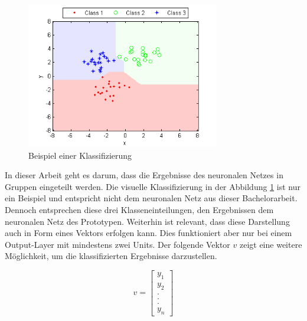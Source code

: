 \begin{figure}[H]
	\centering
		\includegraphics[width=0.75\textwidth]{images/nn_classifier.png}
	\caption{Beispiel einer Klassifizierung \citep{yuClass}}
	\label{fig:nn_class}
\end{figure}

In dieser Arbeit geht es darum, dass die Ergebnisse des neuronalen Netzes in Gruppen eingeteilt werden. Die visuelle Klassifizierung in der Abbildung \ref{fig:nn_class} ist nur ein Beispiel und entspricht nicht dem neuronalen Netz aus dieser Bachelorarbeit. Dennoch entsprechen diese drei Klasseneinteilungen, den Ergebnissen dem neuronalen Netz des Prototypen. Weiterhin ist relevant, dass diese Darstellung auch in Form eines Vektors erfolgen kann. Dies funktioniert aber nur bei einem Output-Layer mit mindestens zwei Units. Der folgende Vektor \(v\) zeigt eine weitere Möglichkeit, um die klassifizierten Ergebnisse darzustellen.
\newline

\[\displaystyle v = \begin{bmatrix}y_1 \\ y_2 \\ . \\ . \\ . \\ y_n\end{bmatrix}\]

